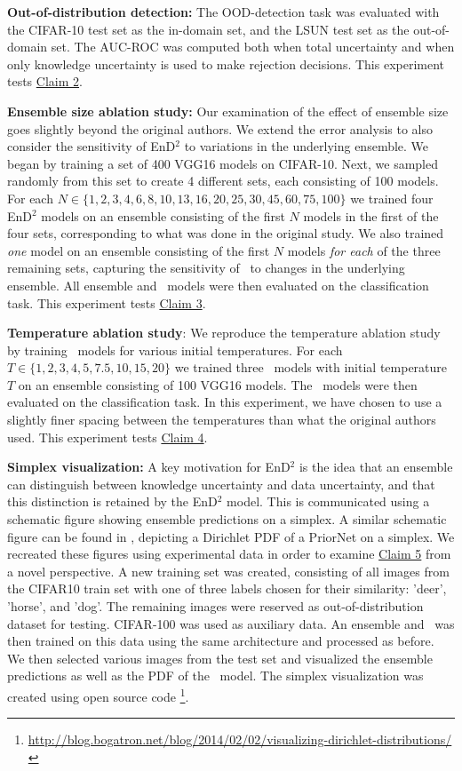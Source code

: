 \textbf{Out-of-distribution detection:} The OOD-detection task was evaluated with the CIFAR-10 test set as the in-domain set, and the LSUN test set as the out-of-domain set. The AUC-ROC was computed both when total uncertainty and when only knowledge uncertainty is used to make rejection decisions. This experiment tests \hyperlink{claim2}{Claim 2}. 

\textbf{Ensemble size ablation study:} Our examination of the effect of ensemble size goes slightly beyond the original authors. We extend the error analysis to also consider the sensitivity of EnD$^2$ to variations in the underlying ensemble. We began by training a set of 400 VGG16 models on CIFAR-10. Next, we sampled randomly from this set to create 4 different sets, each consisting of 100 models. \\ For each $N \in \{1, 2, 3, 4, 6, 8, 10, 13, 16, 20, 25, 30, 45, 60, 75, 100\}$ we trained four EnD$^2$ models on an ensemble consisting of the first $N$ models in the first of the four sets, corresponding to what was done in the original study. We also trained \textit{one} model on an ensemble consisting of the first $N$ models \textit{for each} of the three remaining sets, capturing the sensitivity of \EnDD \ to changes in the underlying ensemble. All ensemble and \EnDD \ models were then evaluated on the classification task. This experiment tests \hyperlink{claim3}{Claim 3}. 

\textbf{Temperature ablation study}: We reproduce the temperature ablation study by training \EnDD \ models for various initial temperatures. For each $T \in \{1, 2, 3, 4, 5, 7.5, 10, 15, 20\}$ we trained three \EnDD \ models with initial temperature $T$ on an ensemble consisting of 100 VGG16 models. The \EnDD \ models were then evaluated on the classification task. In this experiment, we have chosen to use a slightly finer spacing between the temperatures than what the original authors used. This experiment tests \hyperlink{claim4}{Claim 4}.

\textbf{Simplex visualization:} A key motivation for EnD$^2$ is the idea that an ensemble can distinguish between knowledge uncertainty and data uncertainty, and that this distinction is retained by the EnD$^2$ model. This is communicated using a schematic figure showing ensemble predictions on a simplex. A similar schematic figure can be found in \cite{NIPS2018_7936}, depicting a Dirichlet PDF of a PriorNet on a simplex. We recreated these figures using experimental data in order to examine \hyperlink{claim5}{Claim 5} from a novel perspective. A new training set was created, consisting of all images from the CIFAR10 train set with one of three labels chosen for their similarity: 'deer', 'horse', and 'dog'. The remaining images were reserved as out-of-distribution dataset for testing. CIFAR-100 was used as auxiliary data. An ensemble and \EnDD \ was then trained on this data using the same architecture and processed as before. We then selected various images from the test set and visualized the ensemble predictions as well as the PDF of the \EnDD \ model. The simplex visualization was created using open source code \footnote{\url{http://blog.bogatron.net/blog/2014/02/02/visualizing-dirichlet-distributions/}}.

